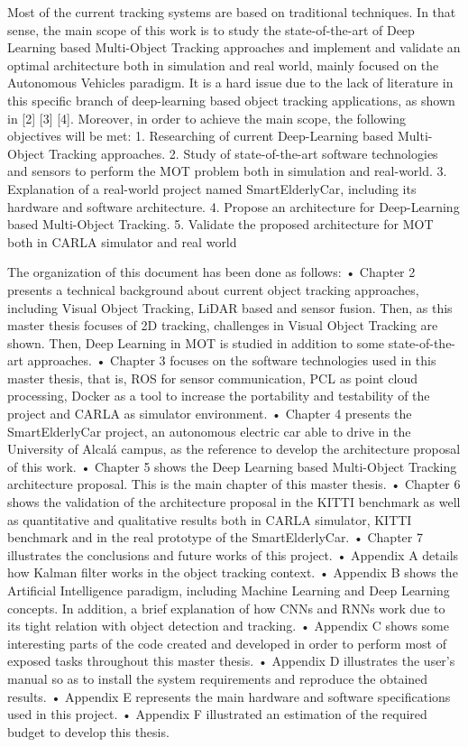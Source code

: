 Most of the current tracking systems are based on traditional techniques. In that sense, the
main scope of this work is to study the state-of-the-art of Deep Learning based Multi-Object
Tracking approaches and implement and validate an optimal architecture both in
simulation and real world, mainly focused on the Autonomous Vehicles paradigm. It is a
hard issue due to the lack of literature in this specific branch of deep-learning based object
tracking applications, as shown in [2] [3] [4]. Moreover, in order to achieve the main scope,
the following objectives will be met:
1. Researching of current Deep-Learning based Multi-Object Tracking approaches.
2. Study of state-of-the-art software technologies and sensors to perform the MOT
problem both in simulation and real-world.
3. Explanation of a real-world project named SmartElderlyCar, including its hardware and
software architecture.
4. Propose an architecture for Deep-Learning based Multi-Object Tracking.
5. Validate the proposed architecture for MOT both in CARLA simulator and real world

The organization of this document has been done as follows:
• Chapter 2 presents a technical background about current object tracking
approaches, including Visual Object Tracking, LiDAR based and sensor fusion. Then,
as this master thesis focuses of 2D tracking, challenges in Visual Object Tracking are
shown. Then, Deep Learning in MOT is studied in addition to some state-of-the-art
approaches.
• Chapter 3 focuses on the software technologies used in this master thesis, that is,
ROS for sensor communication, PCL as point cloud processing, Docker as a tool to
increase the portability and testability of the project and CARLA as simulator
environment.
• Chapter 4 presents the SmartElderlyCar project, an autonomous electric car able to
drive in the University of Alcalá campus, as the reference to develop the architecture
proposal of this work.
• Chapter 5 shows the Deep Learning based Multi-Object Tracking architecture
proposal. This is the main chapter of this master thesis.
• Chapter 6 shows the validation of the architecture proposal in the KITTI benchmark
as well as quantitative and qualitative results both in CARLA simulator, KITTI
benchmark and in the real prototype of the SmartElderlyCar.
• Chapter 7 illustrates the conclusions and future works of this project.
• Appendix A details how Kalman filter works in the object tracking context.
• Appendix B shows the Artificial Intelligence paradigm, including Machine Learning
and Deep Learning concepts. In addition, a brief explanation of how CNNs and RNNs
work due to its tight relation with object detection and tracking.
• Appendix C shows some interesting parts of the code created and developed in order
to perform most of exposed tasks throughout this master thesis.
• Appendix D illustrates the user’s manual so as to install the system requirements and
reproduce the obtained results.
• Appendix E represents the main hardware and software specifications used in this
project.
• Appendix F illustrated an estimation of the required budget to develop this thesis.
